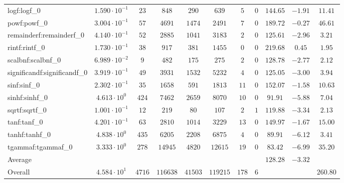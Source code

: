 \begin{tabular}{|l|c|c|c|c|c|c|c|c|c|c|}
logf:logf\_0                 & $ 1.590 \cdot 10^{-1} $ & $ 23     $ & $ 848    $ & $ 290   $ & $ 639    $ & $ 5   $ & $ 0 $ & $ 144.65      $ & $ -1.91   $ & $ 11.41   $ \\
powf:powf\_0                 & $ 3.004 \cdot 10^{-1} $ & $ 57     $ & $ 4691   $ & $ 1474  $ & $ 2491   $ & $ 7   $ & $ 0 $ & $ 189.72      $ & $ -0.27   $ & $ 46.61   $ \\
remainderf:remainderf\_0     & $ 4.140 \cdot 10^{-1} $ & $ 52     $ & $ 2885   $ & $ 1041  $ & $ 3183   $ & $ 2   $ & $ 0 $ & $ 125.61      $ & $ -2.96   $ & $ 3.21    $ \\
rintf:rintf\_0               & $ 1.730 \cdot 10^{-1} $ & $ 38     $ & $ 917    $ & $ 381   $ & $ 1455   $ & $ 0   $ & $ 0 $ & $ 219.68      $ & $ 0.45    $ & $ 1.95    $ \\
scalbnf:scalbnf\_0           & $ 6.989 \cdot 10^{-2} $ & $ 9      $ & $ 482    $ & $ 175   $ & $ 275    $ & $ 2   $ & $ 0 $ & $ 128.78      $ & $ -2.77   $ & $ 2.12    $ \\
significandf:significandf\_0 & $ 3.919 \cdot 10^{-1} $ & $ 49     $ & $ 3931   $ & $ 1532  $ & $ 5232   $ & $ 4   $ & $ 0 $ & $ 125.05      $ & $ -3.00   $ & $ 3.94    $ \\
sinf:sinf\_0                 & $ 2.302 \cdot 10^{-1} $ & $ 35     $ & $ 1658   $ & $ 591   $ & $ 1813   $ & $ 11  $ & $ 0 $ & $ 152.07      $ & $ -1.58   $ & $ 10.63   $ \\
sinhf:sinhf\_0               & $ 4.613 \cdot 10^{0}  $ & $ 424    $ & $ 7462   $ & $ 2659  $ & $ 8070   $ & $ 10  $ & $ 0 $ & $ 91.91       $ & $ -5.88   $ & $ 7.04    $ \\
sqrtf:sqrtf\_0               & $ 1.001 \cdot 10^{-1} $ & $ 12     $ & $ 219    $ & $ 80    $ & $ 107    $ & $ 2   $ & $ 1 $ & $ 119.88      $ & $ -3.34   $ & $ 2.13    $ \\
tanf:tanf\_0                 & $ 4.201 \cdot 10^{-1} $ & $ 63     $ & $ 2810   $ & $ 1014  $ & $ 3229   $ & $ 13  $ & $ 0 $ & $ 149.97      $ & $ -1.67   $ & $ 15.00   $ \\
tanhf:tanhf\_0               & $ 4.838 \cdot 10^{0}  $ & $ 435    $ & $ 6205   $ & $ 2208  $ & $ 6875   $ & $ 4   $ & $ 0 $ & $ 89.91       $ & $ -6.12   $ & $ 3.41    $ \\
tgammaf:tgammaf\_0           & $ 3.333 \cdot 10^{0}  $ & $ 278    $ & $ 14945  $ & $ 4820  $ & $ 12615  $ & $ 19  $ & $ 0 $ & $ 83.42       $ & $ -6.99   $ & $ 35.20   $ \\
\hline
Average                      & $                     $ & $        $ & $        $ & $       $ & $        $ & $     $ & $   $ & $ 128.28      $ & $ -3.32   $ & $         $ \\
\hline
Overall                      & $ 4.584 \cdot 10^{1}  $ & $ 4716   $ & $ 116638 $ & $ 41503 $ & $ 119215 $ & $ 178 $ & $ 6 $ & $             $ & $         $ & $ 260.80  $ \\
\hline
\end{tabular}
